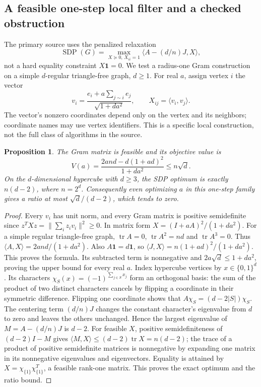 \documentclass[11pt]{article}
\newtheorem{proposition}{Proposition}
\begin{document}
\subsection{A feasible one-step local filter and a checked obstruction}
The primary source uses the penalized relaxation
\[
\operatorname{SDP}(G)=\max_{X\succeq0,\,X_{ii}=1}\langle A-(d/n)J,X\rangle,
\]
not a hard equality constraint $X\mathbf1=0$. We test a radius-one Gram construction on a simple $d$-regular triangle-free graph, $d\ge1$. For real $a$, assign vertex $i$ the vector
\[
v_i=\frac{e_i+a\sum_{j\sim i}e_j}{\sqrt{1+da^2}},
\qquad X_{ij}=\langle v_i,v_j\rangle.
\]
The vector's nonzero coordinates depend only on the vertex and its neighbors; coordinate names may use vertex identifiers. This is a specific local construction, not the full class of algorithms in the source.
\begin{proposition}
The Gram matrix is feasible and its objective value is
\[
V(a)=\frac{2and-d(1+ad)^2}{1+da^2}\le n\sqrt d.
\]
On the $d$-dimensional hypercube with $d\ge3$, the SDP optimum is exactly $n(d-2)$, where $n=2^d$. Consequently even optimizing $a$ in this one-step family gives a ratio at most $\sqrt d/(d-2)$, which tends to zero.
\end{proposition}
\begin{proof}
Every $v_i$ has unit norm, and every Gram matrix is positive semidefinite since $z^TXz=\|\sum_i z_iv_i\|^2\ge0$. In matrix form $X=(I+aA)^2/(1+da^2)$. For a simple regular triangle-free graph, $\operatorname{tr}A=0$, $\operatorname{tr}A^2=nd$ and $\operatorname{tr}A^3=0$. Thus $\langle A,X\rangle=2and/(1+da^2)$. Also $A\mathbf1=d\mathbf1$, so $\langle J,X\rangle=n(1+ad)^2/(1+da^2)$. This proves the formula. Its subtracted term is nonnegative and $2a\sqrt d\le1+da^2$, proving the upper bound for every real $a$.
Index hypercube vertices by $x\in\{0,1\}^d$. Its characters $\chi_S(x)=(-1)^{\sum_{j\in S}x_j}$ form an orthogonal basis: the sum of the product of two distinct characters cancels by flipping a coordinate in their symmetric difference. Flipping one coordinate shows that $A\chi_S=(d-2|S|)\chi_S$. The centering term $(d/n)J$ changes the constant character's eigenvalue from $d$ to zero and leaves the others unchanged. Hence the largest eigenvalue of $M=A-(d/n)J$ is $d-2$. For feasible $X$, positive semidefiniteness of $(d-2)I-M$ gives $\langle M,X\rangle\le(d-2)\operatorname{tr}X=n(d-2)$; the trace of a product of positive semidefinite matrices is nonnegative by expanding one matrix in its nonnegative eigenvalues and eigenvectors. Equality is attained by $X=\chi_{\{1\}}\chi_{\{1\}}^T$, a feasible rank-one matrix. This proves the exact optimum and the ratio bound.
\end{proof}
\end{document}
